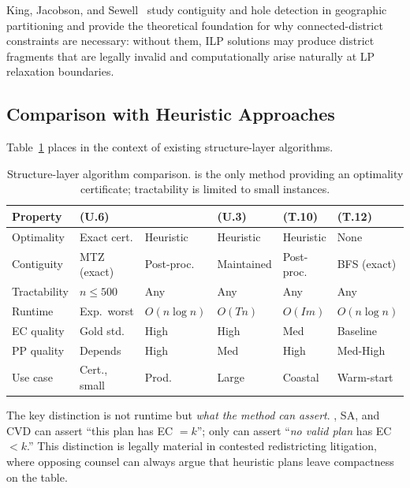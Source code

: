 King, Jacobson, and Sewell~\citeyear{king2015} study contiguity and
hole detection in geographic partitioning and provide the theoretical
foundation for why connected-district constraints are necessary:
without them, ILP solutions may produce district fragments that are
legally invalid and computationally arise naturally at LP relaxation
boundaries.

\subsection{Comparison with Heuristic Approaches}

Table~\ref{tab:method-compare} places \ilp{} in the context of existing
structure-layer algorithms.

\begin{table}[t]
\centering
\caption{%
  Structure-layer algorithm comparison. \ilp{} is the only method providing
  an optimality certificate; tractability is limited to small instances.
}
\label{tab:method-compare}
\renewcommand{\arraystretch}{1.3}
\begin{tabular}{@{}llllll@{}}
\toprule
Property & \ilp{} (U.6) & \metis{} & \sa{} (U.3) & \cvd{} (T.10) & \bfsg{} (T.12) \\
\midrule
Optimality    & Exact cert. & Heuristic & Heuristic & Heuristic & None \\
Contiguity    & MTZ (exact) & Post-proc. & Maintained & Post-proc. & BFS (exact) \\
Tractability  & $n \leq 500$ & Any & Any & Any & Any \\
Runtime       & Exp.\ worst & $O(n \log n)$ & $O(T n)$ & $O(I m)$ & $O(n \log n)$ \\
EC quality    & Gold std.   & High & High & Med & Baseline \\
PP quality    & Depends     & High & Med & High & Med-High \\
Use case      & Cert., small & Prod. & Large & Coastal & Warm-start \\
\bottomrule
\end{tabular}
\end{table}

The key distinction is not runtime but \emph{what the method can assert}.
\metis{}, SA, and CVD can assert ``this plan has EC $= k$''; only \ilp{}
can assert ``\emph{no valid plan} has EC $< k$.''
This distinction is legally material in contested redistricting litigation,
where opposing counsel can always argue that heuristic plans leave
compactness on the table.
